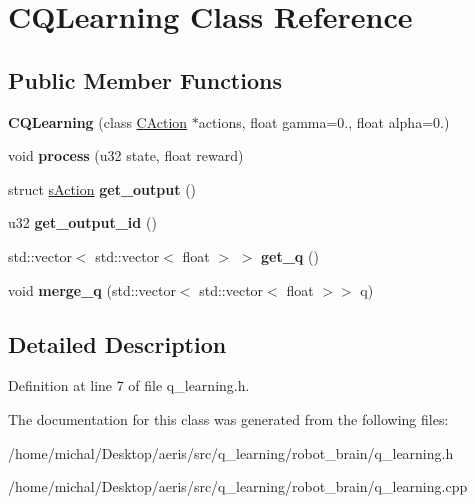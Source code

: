 \hypertarget{classCQLearning}{\section{C\-Q\-Learning Class Reference}
\label{classCQLearning}
}
\subsection*{Public Member Functions}
\begin{DoxyCompactItemize}
\item 
\hypertarget{classCQLearning_a52d6a162d905b15f6508cc290cdb4eec}{{\bfseries C\-Q\-Learning} (class \hyperlink{classCAction}{C\-Action} $\ast$actions, float gamma=0., float alpha=0.)}\label{classCQLearning_a52d6a162d905b15f6508cc290cdb4eec}

\item 
\hypertarget{classCQLearning_ad86b4ba20b5d5e260f95ee9bb27173c7}{void {\bfseries process} (u32 state, float reward)}\label{classCQLearning_ad86b4ba20b5d5e260f95ee9bb27173c7}

\item 
\hypertarget{classCQLearning_a5bb2e8cf4bb7df2062c82dd6765b3047}{struct \hyperlink{structsAction}{s\-Action} {\bfseries get\-\_\-output} ()}\label{classCQLearning_a5bb2e8cf4bb7df2062c82dd6765b3047}

\item 
\hypertarget{classCQLearning_aff5c6161ec62e1f49dfc4c0b935c7cd1}{u32 {\bfseries get\-\_\-output\-\_\-id} ()}\label{classCQLearning_aff5c6161ec62e1f49dfc4c0b935c7cd1}

\item 
\hypertarget{classCQLearning_a510eff90443f421ee5bd5b4ff987c4de}{std\-::vector$<$ std\-::vector$<$ float $>$ $>$ {\bfseries get\-\_\-q} ()}\label{classCQLearning_a510eff90443f421ee5bd5b4ff987c4de}

\item 
\hypertarget{classCQLearning_ab7d3baf842e380ae3bfe38f4ee932c38}{void {\bfseries merge\-\_\-q} (std\-::vector$<$ std\-::vector$<$ float $>$$>$ q)}\label{classCQLearning_ab7d3baf842e380ae3bfe38f4ee932c38}

\end{DoxyCompactItemize}


\subsection{Detailed Description}


Definition at line 7 of file q\-\_\-learning.\-h.



The documentation for this class was generated from the following files\-:\begin{DoxyCompactItemize}
\item 
/home/michal/\-Desktop/aeris/src/q\-\_\-learning/robot\-\_\-brain/q\-\_\-learning.\-h\item 
/home/michal/\-Desktop/aeris/src/q\-\_\-learning/robot\-\_\-brain/q\-\_\-learning.\-cpp\end{DoxyCompactItemize}
